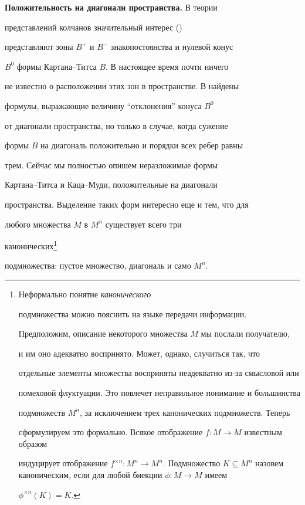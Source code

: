  


{\bf Положительность на диагонали пространства.} В теории 


представлений колчанов значительный интерес (\cite{4}) 


представляют зоны $B^+$ и $B^-$ знакопостоянства и нулевой конус 


$B^0$ формы Картана--Титса $B$. В настоящее время почти ничего 


не известно о расположении этих зон в пространстве. В \cite{5} найдены 


формулы, выражающие величину ``отклонения'' конуса $B^0$ 


от диагонали пространства, но только в случае, когда сужение 


формы $B$ на диагональ положительно и порядки всех ребер равны 


трем. Сейчас мы полностью опишем неразложимые формы 


Картана--Титса и Каца--Муди, положительные на диагонали 


пространства. Выделение таких форм интересно еще и тем, что для 


любого множества $M$ в $M^n$ существует всего три 


канонических\footnote{Неформально понятие {\it канонического} 


подмножества можно пояснить на языке передачи информации. 


Предположим, описание некоторого множества $M$ мы послали получателю, 


и им оно адекватно воспринято. Может, однако, случиться так, что 


отдельные элементы множества восприняты неадекватно из-за смысловой или 


помеховой флуктуации. Это повлечет неправильное понимание и большинства 


подмножеств $M^n$, за исключением трех канонических подмножеств. Теперь 


сформулируем это формально. Всякое отображение $f:M\to M$ известным образом 


индуцирует отображение $f^{\times n}:M^n\to M^n$. Подмножество $K\subseteq 


M^n$ назовем каноническим, если для любой биекции $\phi:M\to M$ имеем 


$\phi^{\times n}(K)=K$.} %


подмножества: пустое множество, диагональ и само $M^n$. 


